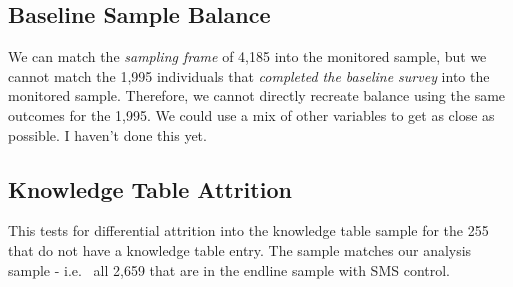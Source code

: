 \documentclass[
]{article}
\begin{document}
\FloatBarrier

\subsection{Baseline Sample Balance}\label{baseline-sample-balance}

We can match the \emph{sampling frame} of 4,185 into the monitored
sample, but we cannot match the 1,995 individuals that \emph{completed
the baseline survey} into the monitored sample. Therefore, we cannot
directly recreate balance using the same outcomes for the 1,995. We
could use a mix of other variables to get as close as possible. I
haven't done this yet.

\subsection{Knowledge Table Attrition}\label{knowledge-table-attrition}

This tests for differential attrition into the knowledge table sample
for the 255 that do not have a knowledge table entry. The sample matches
our analysis sample - i.e.~ all 2,659 that are in the endline sample
with SMS control.
\end{document}

